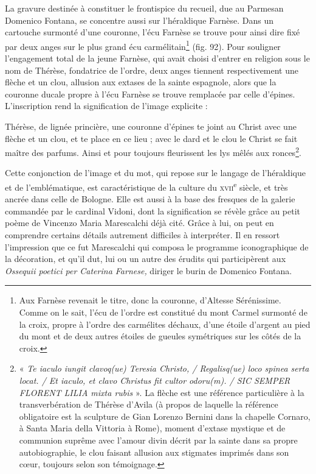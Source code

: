 \documentclass[12pt,twoside,openany]{book}
\renewenvironment{quote}
  {%
    \par\begingroup
    \fontsize{11pt}{14pt}\selectfont
    \list{}{\leftmargin=1.5em\rightmargin=1.5em}%
    \item\relax
  }
  {%
    \endlist
    \endgroup
  }
\newenvironment{PurhBlockQuote}
  {%
    \begin{quote}
  }
  {%
    \end{quote}
  }
\begin{document}
La gravure destinée à constituer le frontispice du recueil, due au Parmesan Domenico Fontana, se concentre aussi sur l’héraldique Farnèse. Dans un cartouche surmonté d’une couronne, l’écu Farnèse se trouve pour ainsi dire fixé par deux anges sur le plus grand écu carmélitain\footnote{Aux Farnèse revenait le titre, donc la couronne, d’Altesse Sérénissime. Comme on le sait, l’écu de l’ordre est constitué du mont Carmel surmonté de la croix, propre à l’ordre des carmélites déchaux, d’une étoile d’argent au pied du mont et de deux autres étoiles de gueules symétriques sur les côtés de la croix.} (fig. 92). Pour souligner l’engagement total de la jeune Farnèse, qui avait choisi d’entrer en religion sous le nom de Thérèse, fondatrice de l’ordre, deux anges tiennent respectivement une flèche et un clou, allusion aux extases de la sainte espagnole, alors que la couronne ducale propre à l’écu Farnèse se trouve remplacée par celle d’épines. L’inscription rend la signification de l’image explicite :

\begin{PurhBlockQuote}
Thérèse, de lignée princière, une couronne d’épines te joint au Christ avec une flèche et un clou, et te place en ce lieu ; avec le dard et le clou le Christ se fait maître des parfums. Ainsi et pour toujours fleurissent les lys mêlés aux ronces\footnote{« \textit{Te iaculo iungit clavoq(ue) Teresia Christo, / Regalisq(ue) loco spinea serta locat. / Et iaculo, et clavo Christus fit cultor odoru(m). / SIC SEMPER FLORENT LILIA mixta rubis} ». La flèche est une référence particulière à la transverbération de Thérèse d’Avila (à propos de laquelle la référence obligatoire est la sculpture de Gian Lorenzo Bernini dans la chapelle Cornaro, à Santa Maria della Vittoria à Rome), moment d’extase mystique et de communion suprême avec l’amour divin décrit par la sainte dans sa propre autobiographie, le clou faisant allusion aux stigmates imprimés dans son cœur, toujours selon son témoignage.}.
\end{PurhBlockQuote}

Cette conjonction de l’image et du mot, qui repose sur le langage de l’héraldique et de l’emblématique, est caractéristique de la culture du \textsc{xvii}\textsuperscript{e} siècle, et très ancrée dans celle de Bologne. Elle est aussi à la base des fresques de la galerie commandée par le cardinal Vidoni, dont la signification se révèle grâce au petit poème de Vincenzo Maria Marescalchi déjà cité. Grâce à lui, on peut en comprendre certains détails autrement difficiles à interpréter. Il en ressort l’impression que ce fut Marescalchi qui composa le programme iconographique de la décoration, et qu’il dut, lui ou un autre des érudits qui participèrent aux \textit{Ossequii poetici per Caterina Farnese,} diriger le burin de Domenico Fontana.
\end{document}
